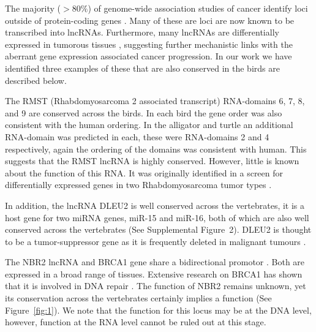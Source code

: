 \documentclass[10pt]{bmc_article}
\newenvironment{bmcformat}{\begin{raggedright}\baselineskip20pt\sloppy\setboolean{publ}{false}}{\end{raggedright}\baselineskip20pt\sloppy}
\begin{document}
\begin{bmcformat}

The majority ($>80\%$) of genome-wide association studies of cancer
identify loci outside of protein-coding genes
\cite{Cheetham:2013}. Many of these are loci are now known to be
transcribed into lncRNAs. Furthermore, many lncRNAs are differentially
expressed in tumorous tissues \cite{Chan:2002}, suggesting further
mechanistic links with the aberrant gene expression associated cancer
progression. In our work we have identified three examples of these
that are also conserved in the birds are described below.

The RMST (Rhabdomyosarcoma 2 associated transcript) RNA-domains 6, 7,
8, and 9 are conserved across the birds. In each bird the gene order
was also consistent with the human ordering. In the alligator and
turtle an additional RNA-domain was predicted in each, these were
RNA-domains 2 and 4 respectively, again the ordering of the domains
was consistent with human. This suggests that the RMST lncRNA is
highly conserved. However, little is known about the function of this
RNA. It was originally identified in a screen for differentially
expressed genes in two Rhabdomyosarcoma tumor types \cite{Chan:2002}.

In addition, the lncRNA DLEU2 is well conserved across the
vertebrates, it is a host gene for two miRNA genes, miR-15 and miR-16,
both of which are also well conserved across the vertebrates (See
Supplemental Figure~2). DLEU2 is thought to be a tumor-suppressor gene
as it is frequently deleted in malignant tumours
\cite{Lerner:2009,Klein:2010}.

The NBR2 lncRNA and BRCA1 gene share a bidirectional promotor
\cite{Xu:1997}. Both are expressed in a broad range of
tissues. Extensive research on BRCA1 has shown that it is involved in
DNA repair \cite{Moynahan:1999}. The function of NBR2 remains unknown,
yet its conservation across the vertebrates certainly implies a
function (See Figure~\ref{fig:1}). We note that the function for this
locus may be at the DNA level, however, function at the RNA level
cannot be ruled out at this stage.


\end{bmcformat}
\end{document}
